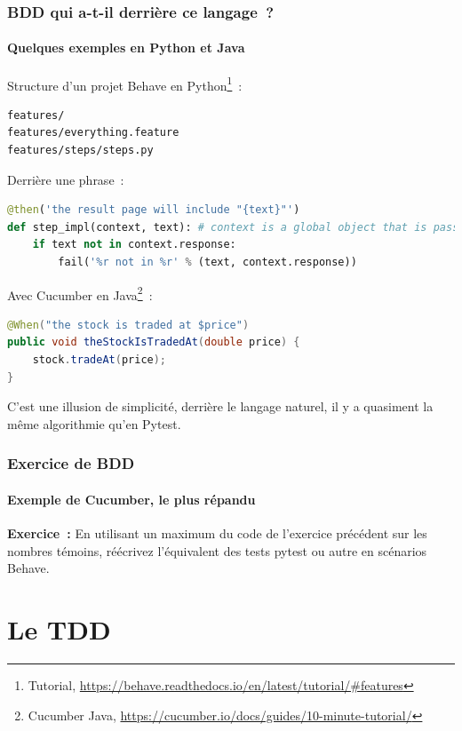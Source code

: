 \documentclass{beamer}
\begin{document}
    \begin{frame}[fragile]
        \frametitle{BDD qui a-t-il derrière ce langage~?}
        \framesubtitle{Quelques exemples en Python et Java}
        \transdissolve
        Structure d'un projet Behave en Python\footnote{Tutorial, \url{https://behave.readthedocs.io/en/latest/tutorial/\#features}}~:
        \begin{lstlisting}[basicstyle=\ttfamily\tiny]
features/
features/everything.feature
features/steps/steps.py
        \end{lstlisting}
        Derrière une phrase~:
        \begin{lstlisting}[language=Python,basicstyle=\ttfamily\tiny]
@then('the result page will include "{text}"')
def step_impl(context, text): # context is a global object that is passed between all steps
    if text not in context.response:
        fail('%r not in %r' % (text, context.response))
        \end{lstlisting}
        Avec Cucumber en Java\footnote{Cucumber Java, \url{https://cucumber.io/docs/guides/10-minute-tutorial/}}~:
        \begin{lstlisting}[language=Java,basicstyle=\ttfamily\tiny]
@When("the stock is traded at $price")
public void theStockIsTradedAt(double price) {
    stock.tradeAt(price);
}
        \end{lstlisting}
        C'est une illusion de simplicité, derrière le langage naturel, il y a quasiment la même algorithmie qu'en Pytest.
    \end{frame}

    \begin{frame}
        \frametitle{Exercice \execcounterdispinc{} de BDD}
        \framesubtitle{Exemple de Cucumber, le plus répandu}
        \transdissolve
        \textbf{Exercice~:} En utilisant un maximum du code de l'exercice précédent sur les nombres témoins, réécrivez l'équivalent des tests pytest ou autre en scénarios Behave.
    \end{frame}


    \section{Le TDD}\label{sec:le-tdd}
\end{document}
